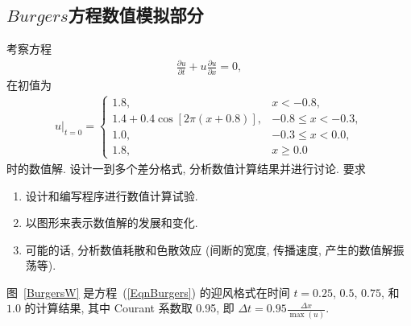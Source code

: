 \documentclass[10.5pt
]{article}
\begin{document}
\subsection{$Burgers$方程数值模拟部分}
考察方程
\begin{align}
\frac{\partial u}{\partial t} + u \frac{\partial u}{\partial x} = 0, \label{EqnBurgers}
\end{align}
在初值为
\begin{align}
u|_{t=0} = \left\{\begin{array}{ll} 1.8, & x < -0.8,
\\
1.4 + 0.4 \cos\left[2 \pi (x + 0.8) \right], & -0.8 \le x < -0.3,
\\
1.0, & -0.3 \le x < 0.0,
\\
1.8, & x \ge 0.0
\end{array} \right.
\end{align}
时的数值解. 设计一到多个差分格式, 分析数值计算结果并进行讨论. 要求
\begin{enumerate}
\item
  设计和编写程序进行数值计算试验.
\item
  以图形来表示数值解的发展和变化.
\item
  可能的话, 分析数值耗散和色散效应 (间断的宽度, 传播速度, 产生的数值解振荡等).
\end{enumerate}

图~\ref{BurgersW} 是方程~(\ref{EqnBurgers}) 的迎风格式在时间 $t = 0.25$, $0.5$, $0.75$, 和 $1.0$ 的计算结果, 其中 Courant 系数取 0.95,
即 $\Delta t = 0.95 \frac{\Delta x}{\max(u)}$.
\end{document}
